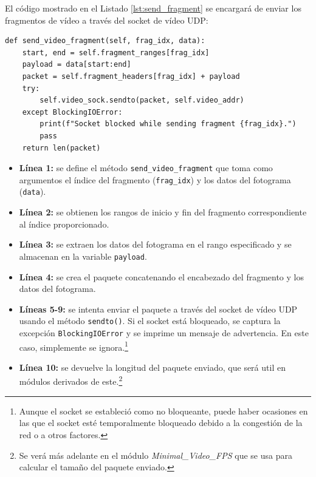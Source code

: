 El código mostrado en el Listado \ref{lst:send_fragment} se encargará de enviar los fragmentos de vídeo a través del socket de vídeo UDP:
\begin{lstlisting}[style=pythonstyle, caption={Método \texttt{send\_video\_fragment()} de \textit{Minimal\_Video}.}, label={lst:send_fragment}]
def send_video_fragment(self, frag_idx, data):
    start, end = self.fragment_ranges[frag_idx]
    payload = data[start:end]
    packet = self.fragment_headers[frag_idx] + payload
    try:
        self.video_sock.sendto(packet, self.video_addr)
    except BlockingIOError:
        print(f"Socket blocked while sending fragment {frag_idx}.")
        pass
    return len(packet)
\end{lstlisting}

\begin{itemize}
    \item \textbf{Línea 1:} se define el método \texttt{send\_video\_fragment} que toma como argumentos el índice del fragmento (\texttt{frag\_idx}) y los datos del fotograma (\texttt{data}).
    \item \textbf{Línea 2:} se obtienen los rangos de inicio y fin del fragmento correspondiente al índice proporcionado.
    \item \textbf{Línea 3:} se extraen los datos del fotograma en el rango especificado y se almacenan en la variable \texttt{payload}.
    \item \textbf{Línea 4:} se crea el paquete concatenando el encabezado del fragmento y los datos del fotograma.
    \item \textbf{Líneas 5-9:} se intenta enviar el paquete a través del socket de vídeo UDP usando el método \texttt{sendto()}. Si el socket está bloqueado, se captura la excepción \texttt{BlockingIOError} y se imprime un mensaje de advertencia. En este caso, simplemente se ignora.\footnote{Aunque el socket se estableció como no bloqueante, puede haber ocasiones en las que el socket esté temporalmente bloqueado debido a la congestión de la red o a otros factores.}
    \item \textbf{Línea 10:} se devuelve la longitud del paquete enviado, que será util en módulos derivados de este.\footnote{Se verá más adelante en el módulo \textit{Minimal\_Video\_FPS} que se usa para calcular el tamaño del paquete enviado.}
\end{itemize}
\vspace{\baselineskip}

